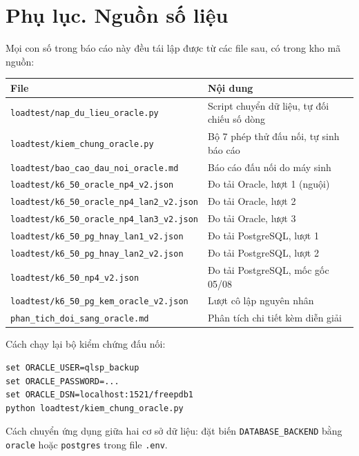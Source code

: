 \documentclass[12pt,a4paper]{article}
\newcommand{\fpath}[1]{\nolinkurl{#1}}
\begin{document}
\clearpage

\section*{Phụ lục. Nguồn số liệu}

Mọi con số trong báo cáo này đều tái lập được từ các file sau, có trong kho mã
nguồn:

\begin{table}[H]
\centering
\footnotesize
\begin{tabular}{@{}L{7.9cm}L{7.3cm}@{}}
\toprule
{}
\bfseries File & \bfseries Nội dung\\
\midrule
\fpath{loadtest/nap_du_lieu_oracle.py} & Script chuyển dữ liệu, tự đối chiếu số dòng\\
\fpath{loadtest/kiem_chung_oracle.py} & Bộ 7 phép thử đấu nối, tự sinh báo cáo\\
\fpath{loadtest/bao_cao_dau_noi_oracle.md} & Báo cáo đấu nối do máy sinh\\
\fpath{loadtest/k6_50_oracle_np4_v2.json} & Đo tải Oracle, lượt 1 (nguội)\\
\fpath{loadtest/k6_50_oracle_np4_lan2_v2.json} & Đo tải Oracle, lượt 2\\
\fpath{loadtest/k6_50_oracle_np4_lan3_v2.json} & Đo tải Oracle, lượt 3\\
\fpath{loadtest/k6_50_pg_hnay_lan1_v2.json} & Đo tải PostgreSQL, lượt 1\\
\fpath{loadtest/k6_50_pg_hnay_lan2_v2.json} & Đo tải PostgreSQL, lượt 2\\
\fpath{loadtest/k6_50_np4_v2.json} & Đo tải PostgreSQL, mốc gốc 05/08\\
\fpath{loadtest/k6_50_pg_kem_oracle_v2.json} & Lượt cô lập nguyên nhân\\
\fpath{phan_tich_doi_sang_oracle.md} & Phân tích chi tiết kèm diễn giải\\
\bottomrule
\end{tabular}
\end{table}

\vspace{0.4cm}

\noindent Cách chạy lại bộ kiểm chứng đấu nối:

\begin{lstlisting}
set ORACLE_USER=qlsp_backup
set ORACLE_PASSWORD=...
set ORACLE_DSN=localhost:1521/freepdb1
python loadtest/kiem_chung_oracle.py
\end{lstlisting}

\noindent Cách chuyển ứng dụng giữa hai cơ sở dữ liệu: đặt biến
\texttt{DATABASE\_BACKEND} bằng \texttt{oracle} hoặc \texttt{postgres} trong
file \texttt{.env}.
\end{document}
